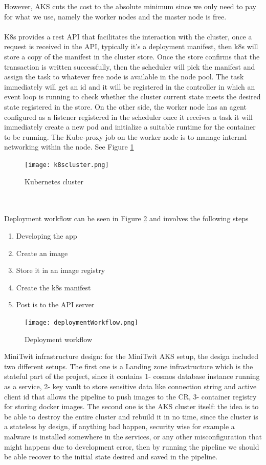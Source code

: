 However, AKS cuts the cost to the absolute minimum since we only need to pay for what we use, namely the worker nodes and the master node is free.
\\\\
K8s provides a rest API that facilitates the interaction with the cluster, once a request is received in the API, typically it's a deployment manifest, then k8s will store a copy of the manifest in the cluster store. Once the store confirms that the transaction is written successfully, then the scheduler will pick the manifest and assign the task to whatever free node is available in the node pool. The task immediately will get an id and it will be registered in the controller in which an event loop is running to check whether the cluster current state meets the desired state registered in the store. On the other side, the worker node has an agent configured as a listener registered in the scheduler once it receives a task it will immediately create a new pod and initialize a suitable runtime for the container to be running. The Kube-proxy job on the worker node is to manage internal networking within the node. See Figure \ref{fig:k8scluster}
\begin{figure}[h]
    \centering
    \texttt{[image: k8scluster.png]}
    \caption{Kubernetes cluster\cite{https://kubernetes.io/KubernetesKubernetes}}
    \label{fig:k8scluster}
\end{figure}
\\\\
Deployment workflow can be seen in Figure \ref{fig:deploymentWorkflow} and involves the following steps
\begin{enumerate}
    \item Developing the app
    \item Create an image
    \item Store it in an image registry
    \item Create the k8s manifest
    \item Post is to the API server
\end{enumerate} 
\begin{figure}[h]
    \centering
    \texttt{[image: deploymentWorkflow.png]}
    \caption{Deployment workflow \cite{https://kubernetes.io/KubernetesKubernetes}}
    \label{fig:deploymentWorkflow}
\end{figure}

MiniTwit infrastructure design: for the MiniTwit AKS setup, the design included two different setups. The first one is a Landing zone infrastructure which is the stateful part of the project, since it contains 1- cosmos database instance running as a service, 2- key vault to store sensitive data like connection string and active client id that allows the pipeline to push images to the CR, 3- container registry for storing docker images. The second one is the AKS cluster itself: the idea is to be able to destroy the entire cluster and rebuild it in no time, since the cluster is a stateless by design, if anything bad happen, security wise for example a malware is installed somewhere in the services, or any other misconfiguration that might happens due to development error, then by running the pipeline we should be able recover to the initial state desired and saved in the pipeline. 


